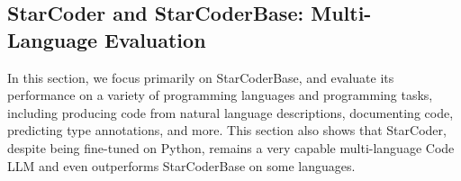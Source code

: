 \documentclass[10pt]{article} %
\begin{document}
\begin{table}[ht]
\centering
{}
\caption{Performance on the ODEX benchmark by instruction languages and code domains: \emph{open} problems use libraries, while \emph{closed} use only built-in Python functions.} 
\label{tab:odex_language-domain}
\end{table}



\subsection{StarCoder and StarCoderBase: Multi-Language Evaluation}

In this section, we focus primarily on StarCoderBase, and evaluate its performance on a variety of programming languages and programming tasks, including producing code from natural language descriptions, documenting code, predicting type annotations, and more. This section also shows that StarCoder, despite being fine-tuned on Python, remains a very capable multi-language Code LLM and even outperforms StarCoderBase on some languages.
\end{document}
